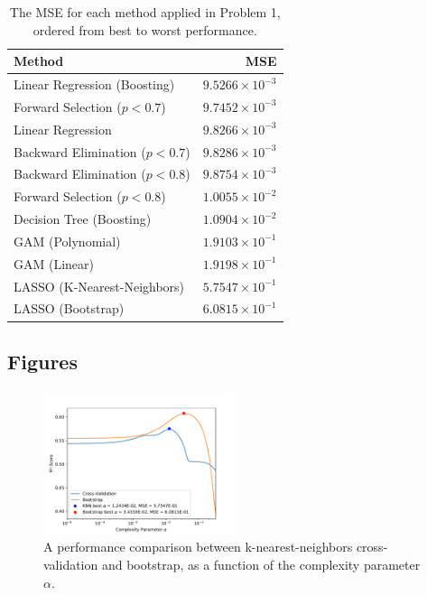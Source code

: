 \documentclass[twoside,twocolumn,10pt]{revtex4-1}
\begin{document}
	\begin{table}[H]
	\center
		\begin{tabular}{l r}
		\textbf{Method} & \textbf{MSE} \\ 
		\hline
		Linear Regression (Boosting) & $9.5266 \times 10^{-3}$\\
		Forward Selection ($p < 0.7$) & $9.7452 \times 10^{-3}$\\
		Linear Regression & $9.8266 \times 10^{-3}$\\
		Backward Elimination ($p < 0.7$) & $9.8286 \times 10^{-3}$\\
		Backward Elimination ($p < 0.8$) & $9.8754 \times 10^{-3}$\\
		Forward Selection ($p < 0.8$) & $1.0055 \times 10^{-2}$\\
		Decision Tree (Boosting) & $1.0904 \times 10^{-2}$ \\
		GAM (Polynomial) & $1.9103 \times 10^{-1}$\\
		GAM (Linear) & $1.9198 \times 10^{-1}$\\
		LASSO (K-Nearest-Neighbors) & $5.7547 \times 10^{-1}$\\
		LASSO (Bootstrap) & $6.0815 \times 10^{-1}$
		\end{tabular}
		\caption{The MSE for each method applied in Problem 1, ordered from best to worst performance.\label{table_8}}
	\end{table}	
	
	\subsection{Figures}
	
	\begin{figure}[H]
	\centering  
	\includegraphics[width = 0.5\textwidth]{plot_1.pdf}
	\caption{A performance comparison between k-nearest-neighbors cross-validation and bootstrap, as a function of the complexity parameter $\alpha$.\label{fig_1}}
	\end{figure}
	
\end{document}
